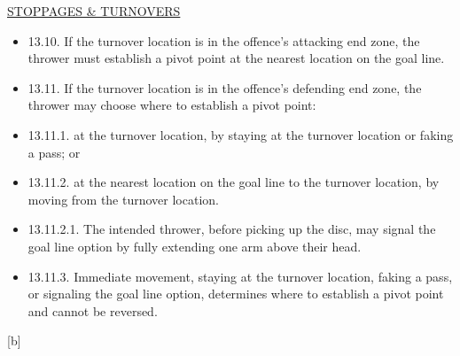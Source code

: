 \underline{\uppercase{stoppages \& turnovers}}
\begin{itemize}[noitemsep]
    \tiny
    \item 13.10. If the turnover location is in the offence’s attacking end zone, the thrower must establish a pivot point at the nearest location on the goal line.
    \item 13.11. If the turnover location is in the offence’s defending end zone, the thrower may choose where to establish a pivot point:
    \item 13.11.1. at the turnover location, by staying at the turnover location or faking a pass; or
    \item 13.11.2. at the nearest location on the goal line to the turnover location, by moving from the turnover location.
    \item 13.11.2.1. The intended thrower, before picking up the disc, may signal the goal line option by fully extending one arm above their head.
    \item 13.11.3. Immediate movement, staying at the turnover location, faking a pass, or signaling the goal line option, determines where to establish a pivot point and cannot be reversed.
\end{itemize}
\begin{center}[b]\end{center}
